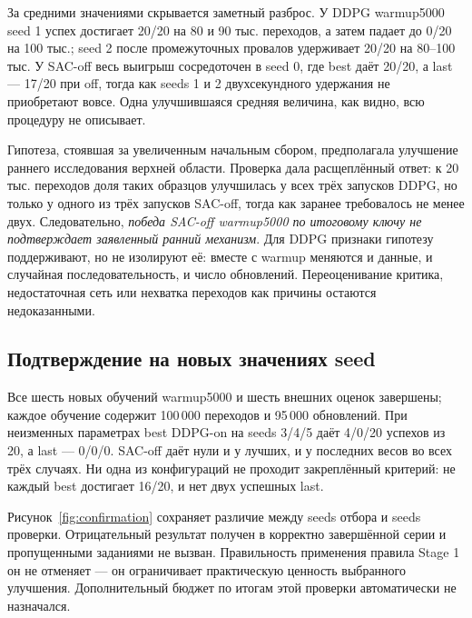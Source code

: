 За средними значениями скрывается заметный разброс. У DDPG warmup5000 seed 1 успех достигает 20/20 на 80 и 90 тыс. переходов, а затем падает до 0/20 на 100 тыс.; seed 2 после промежуточных провалов удерживает 20/20 на 80–100 тыс. У SAC-off весь выигрыш сосредоточен в seed 0, где best даёт 20/20, а last — 17/20 при off, тогда как seeds 1 и 2 двухсекундного удержания не приобретают вовсе. Одна улучшившаяся средняя величина, как видно, всю процедуру не описывает.

Гипотеза, стоявшая за увеличенным начальным сбором, предполагала улучшение раннего исследования верхней области. Проверка дала расщеплённый ответ: к 20 тыс. переходов доля таких образцов улучшилась у всех трёх запусков DDPG, но только у одного из трёх запусков SAC-off, тогда как заранее требовалось не менее двух. Следовательно, \emph{победа SAC-off warmup5000 по итоговому ключу не подтверждает заявленный ранний механизм}. Для DDPG признаки гипотезу поддерживают, но не изолируют её: вместе с warmup меняются и данные, и случайная последовательность, и число обновлений. Переоценивание критика, недостаточная сеть или нехватка переходов как причины остаются недоказанными.

\subsection{Подтверждение на новых значениях seed}
Все шесть новых обучений warmup5000 и шесть внешних оценок завершены; каждое обучение содержит 100\,000 переходов и 95\,000 обновлений. При неизменных параметрах best DDPG-on на seeds 3/4/5 даёт 4/0/20 успехов из 20, а last — 0/0/0. SAC-off даёт нули и у лучших, и у последних весов во всех трёх случаях. Ни одна из конфигураций не проходит закреплённый критерий: не каждый best достигает 16/20, и нет двух успешных last.

Рисунок~\ref{fig:confirmation} сохраняет различие между seeds отбора и seeds проверки. Отрицательный результат получен в корректно завершённой серии и пропущенными заданиями не вызван. Правильность применения правила Stage 1 он не отменяет — он ограничивает практическую ценность выбранного улучшения. Дополнительный бюджет по итогам этой проверки автоматически не назначался.

